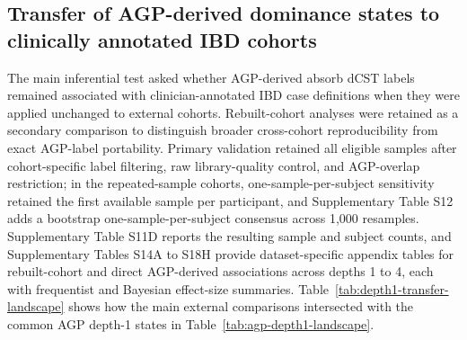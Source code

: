 \documentclass[
  11pt,
]{article}
\begin{document}
\subsection{Transfer of AGP-derived dominance states to clinically annotated IBD cohorts}\label{transfer-of-agp-derived-dominance-states-to-clinically-annotated-ibd-cohorts}

The main inferential test asked whether AGP-derived absorb dCST labels
remained associated with clinician-annotated IBD case definitions when
they were applied unchanged to external cohorts. Rebuilt-cohort analyses
were retained as a secondary comparison to distinguish broader
cross-cohort reproducibility from exact AGP-label portability. Primary
validation retained all eligible samples after cohort-specific label
filtering, raw library-quality control, and AGP-overlap restriction; in
the repeated-sample cohorts, one-sample-per-subject sensitivity retained
the first available sample per participant, and Supplementary Table S12
adds a bootstrap one-sample-per-subject consensus across 1,000
resamples. Supplementary Table S11D reports the resulting sample and
subject counts, and Supplementary Tables S14A
to S18H provide dataset-specific appendix tables for rebuilt-cohort and
direct AGP-derived associations across depths 1 to 4, each with
frequentist and Bayesian effect-size summaries. Table~\ref{tab:depth1-transfer-landscape}
shows how the main external comparisons intersected with the common
AGP depth-1 states in Table~\ref{tab:agp-depth1-landscape}.
\end{document}
